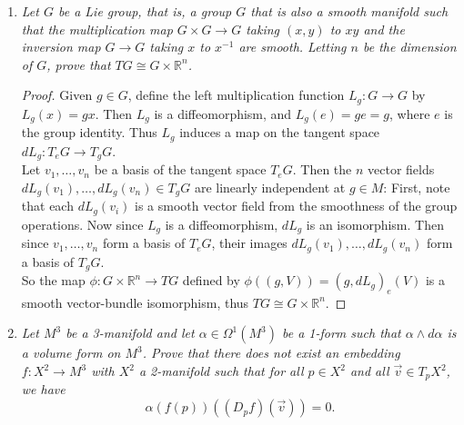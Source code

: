\documentclass{article}
\begin{document}
\begin{enumerate}[label={\bf Q\arabic*:}]
\begin{proof}
      Then, the eigenvectors of $d(T\phi\circ T\phi_0^{-1})$ are $(0,v_i)$
      and $(v_i,0)$, where the $v_i$ are eigenvectors of
      $d(\phi\circ\phi_0^{-1})$. Hence each eigenvalue of
      $d(\phi\circ\phi_0^{-1})$ occurs twice in the eigenvalues of
      $d(T\phi\circ T\phi_0^{-1})$, which implies that
      \[\text{det}(d(T\phi\circ T\phi_0^{-1}))
      =\text{det}(d(\phi\circ\phi_0^{-1}))^2 >0.\]

      Thus for every change of coordinate function, the determinant of its
      Jacobian matrix is positive, which is equivalent to being orientable.
    \end{proof}

  \item \it Let $G$ be a Lie group, that is, a group $G$ that is also a
    smooth manifold such that the multiplication map $G\times G\rightarrow
    G$ taking $(x,y)$ to $xy$ and the inversion map $G\rightarrow G$ taking
    $x$ to $x^{-1}$ are smooth. Letting $n$ be the dimension of $G$, prove
    that $TG\cong G\times\mathbb{R}^n$.

    \begin{proof}
      Given $g\in G$, define the left multiplication function
      $L_g:G\rightarrow G$ by $L_g(x)=gx$. Then $L_g$ is a diffeomorphism,
      and $L_g(e)=ge=g$, where $e$ is the group identity. Thus $L_g$
      induces a map on the tangent space $dL_g:T_eG\rightarrow T_gG$.  \\

      Let $v_1,\ldots,v_n$ be a basis of the tangent space $T_eG$. Then the
      $n$ vector fields $dL_g(v_1),\ldots,dL_g(v_n)\in T_gG$ are linearly
      independent at $g\in M$: First, note that each $dL_g(v_i)$ is a smooth
      vector field from the smoothness of the group operations. Now since
      $L_g$ is a diffeomorphism, $dL_g$ is an isomorphism. Then since
      $v_1,\ldots,v_n$ form a basis of $T_eG$, their images
      $dL_g(v_1),\ldots,dL_g(v_n)$ form a basis of $T_gG$. \\

      So the map $\phi:G\times \mathbb{R}^n\rightarrow TG$ defined by
      $\phi((g,V))=(g,dL_g)_e(V)$ is a smooth vector-bundle isomorphism,
      thus $TG\cong G\times\mathbb{R}^n$.
    \end{proof}

  \item \it Let $M^3$ be a 3-manifold and let $\alpha\in\Omega^1(M^3)$ be a
    1-form such that $\alpha\wedge d\alpha$ is a volume form on $M^3$.
    Prove that there does not exist an embedding $f:X^2\rightarrow M^3$
    with $X^2$ a 2-manifold such that for all $p\in X^2$ and all
    $\vec{v}\in T_pX^2$, we have
    \[\alpha(f(p))((D_pf)(\vec{v}))=0.\]


\end{enumerate}
\end{document}
